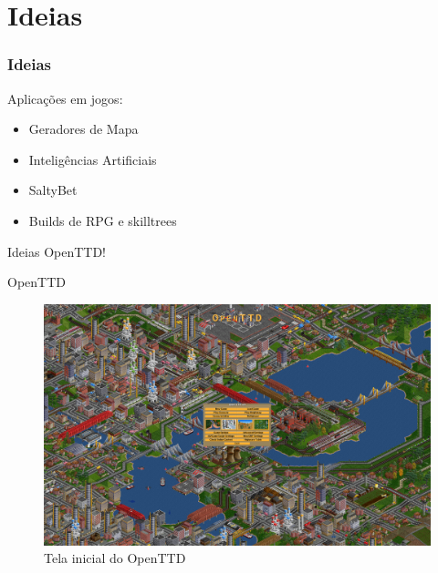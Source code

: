 \documentclass[10pt]{beamer}
\begin{document}
%		

\section{Ideias}

\begin{frame}[fragile]
  \frametitle{Ideias}
	  Aplicações em jogos:\\
	  \begin{itemize} 
	  	\item Geradores de Mapa
	  	\item Inteligências Artificiais
	  	\item SaltyBet
	  	\item Builds de RPG e skilltrees
	  \end{itemize}
\end{frame}

\begin{frame}{Ideias}
	OpenTTD!
\end{frame}

\begin{frame}{OpenTTD}
	\begin{figure}
	\centering
	\includegraphics[width=1\linewidth]{OpenTTD}
	\caption{Tela inicial do OpenTTD}
	\label{fig:OpenTTD}
	\end{figure}
\end{frame}
\end{document}

